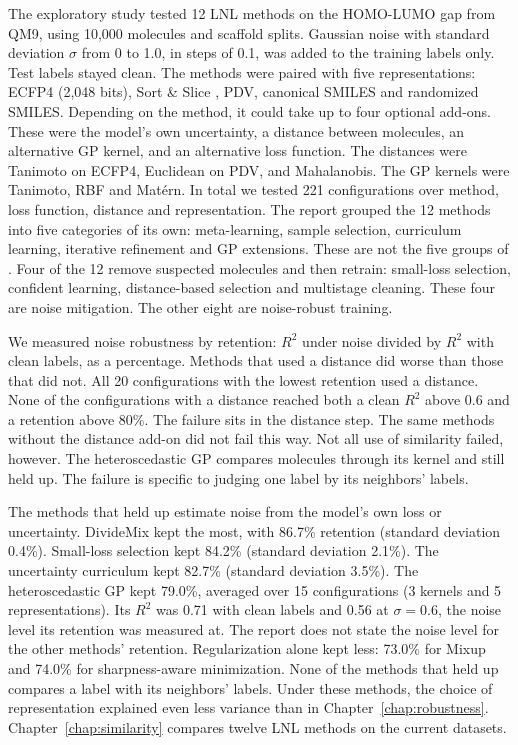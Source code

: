 The exploratory study tested 12 LNL methods on the HOMO-LUMO gap from QM9, using 10,000 molecules and scaffold splits. Gaussian noise with standard deviation $\sigma$ from 0 to 1.0, in steps of 0.1, was added to the training labels only. Test labels stayed clean. The methods were paired with five representations: ECFP4 (2,048 bits), Sort \& Slice \citep{Dablander2024}, PDV, canonical SMILES and randomized SMILES. Depending on the method, it could take up to four optional add-ons. These were the model's own uncertainty, a distance between molecules, an alternative GP kernel, and an alternative loss function. The distances were Tanimoto on ECFP4, Euclidean on PDV, and Mahalanobis. The GP kernels were Tanimoto, RBF and Mat\'{e}rn. In total we tested 221 configurations over method, loss function, distance and representation. The report grouped the 12 methods into five categories of its own: meta-learning, sample selection, curriculum learning, iterative refinement and GP extensions. These are not the five groups of \citet{Song2022}. Four of the 12 remove suspected molecules and then retrain: small-loss selection, confident learning, distance-based selection and multistage cleaning. These four are noise mitigation. The other eight are noise-robust training.

We measured noise robustness by retention: $R^2$ under noise divided by $R^2$ with clean labels, as a percentage. Methods that used a distance did worse than those that did not. All 20 configurations with the lowest retention used a distance. None of the configurations with a distance reached both a clean $R^2$ above 0.6 and a retention above 80\%. The failure sits in the distance step. The same methods without the distance add-on did not fail this way. Not all use of similarity failed, however. The heteroscedastic GP compares molecules through its kernel and still held up. The failure is specific to judging one label by its neighbors' labels.

The methods that held up estimate noise from the model's own loss or uncertainty. DivideMix \citep{li2020dividemix} kept the most, with 86.7\% retention (standard deviation 0.4\%). Small-loss selection \citep{Han2018} kept 84.2\% (standard deviation 2.1\%). The uncertainty curriculum \citep{Bengio2009} kept 82.7\% (standard deviation 3.5\%). The heteroscedastic GP \citep{liu2020} kept 79.0\%, averaged over 15 configurations (3 kernels and 5 representations). Its $R^2$ was 0.71 with clean labels and 0.56 at $\sigma = 0.6$, the noise level its retention was measured at. The report does not state the noise level for the other methods' retention. Regularization alone kept less: 73.0\% for Mixup and 74.0\% for sharpness-aware minimization. None of the methods that held up compares a label with its neighbors' labels. Under these methods, the choice of representation explained even less variance than in Chapter~\ref{chap:robustness}. Chapter~\ref{chap:similarity} compares twelve LNL methods on the current datasets.

